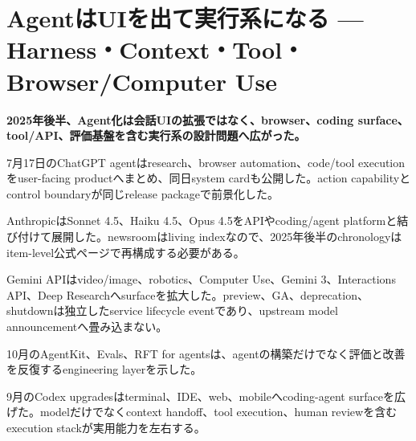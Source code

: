 \section{AgentはUIを出て実行系になる — Harness・Context・Tool・Browser/Computer Use}
\noindent\textbf{2025年後半、Agent化は会話UIの拡張ではなく、browser、coding surface、tool/API、評価基盤を含む実行系の設計問題へ広がった。}\autocite{src-7a7213b68631,src-b074ccdb2d9e}

7月17日のChatGPT agentはresearch、browser automation、code/tool executionをuser-facing productへまとめ、同日system cardも公開した。action capabilityとcontrol boundaryが同じrelease packageで前景化した。\autocite{src-7a7213b68631,src-b074ccdb2d9e}


AnthropicはSonnet 4.5、Haiku 4.5、Opus 4.5をAPIやcoding/agent platformと結び付けて展開した。newsroomはliving indexなので、2025年後半のchronologyはitem-level公式ページで再構成する必要がある。\autocite{src-f6aa679babd7}


Gemini APIはvideo/image、robotics、Computer Use、Gemini 3、Interactions API、Deep Researchへsurfaceを拡大した。preview、GA、deprecation、shutdownは独立したservice lifecycle eventであり、upstream model announcementへ畳み込まない。\autocite{src-a24fd97eb3d0}


10月のAgentKit、Evals、RFT for agentsは、agentの構築だけでなく評価と改善を反復するengineering layerを示した。\autocite{src-0661418088b8}


9月のCodex upgradesはterminal、IDE、web、mobileへcoding-agent surfaceを広げた。modelだけでなくcontext handoff、tool execution、human reviewを含むexecution stackが実用能力を左右する。\autocite{src-6deeebce1719}
